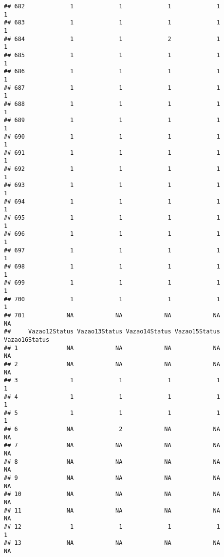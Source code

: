 \documentclass[
]{article}
\begin{document}
\begin{verbatim}
## 682             1             1             1             1             1
## 683             1             1             1             1             1
## 684             1             1             2             1             1
## 685             1             1             1             1             1
## 686             1             1             1             1             1
## 687             1             1             1             1             1
## 688             1             1             1             1             1
## 689             1             1             1             1             1
## 690             1             1             1             1             1
## 691             1             1             1             1             1
## 692             1             1             1             1             1
## 693             1             1             1             1             1
## 694             1             1             1             1             1
## 695             1             1             1             1             1
## 696             1             1             1             1             1
## 697             1             1             1             1             1
## 698             1             1             1             1             1
## 699             1             1             1             1             1
## 700             1             1             1             1             1
## 701            NA            NA            NA            NA            NA
##     Vazao12Status Vazao13Status Vazao14Status Vazao15Status Vazao16Status
## 1              NA            NA            NA            NA            NA
## 2              NA            NA            NA            NA            NA
## 3               1             1             1             1             1
## 4               1             1             1             1             1
## 5               1             1             1             1             1
## 6              NA             2            NA            NA            NA
## 7              NA            NA            NA            NA            NA
## 8              NA            NA            NA            NA            NA
## 9              NA            NA            NA            NA            NA
## 10             NA            NA            NA            NA            NA
## 11             NA            NA            NA            NA            NA
## 12              1             1             1             1             1
## 13             NA            NA            NA            NA            NA

\end{verbatim}
\end{document}
